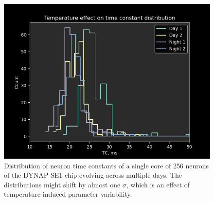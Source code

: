\begin{figure}[h]
\centering
    \includegraphics[width=.7\textwidth]{img/chapter2/time_constant_distribution_vs_temperature.png}
  \caption[Temperature dependence illustration]{Distribution of neuron time constants of a single core of 256 neurons of the DYNAP-SE1 chip evolving across multiple days. The distributions might shift by almost one $\sigma$, which is an effect of temperature-induced parameter variability.}
\label{fig:TC_temperature_variability}
\end{figure}

